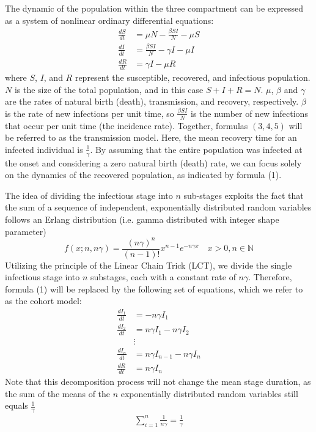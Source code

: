 \documentclass[12pt]{article}
\begin{document}
The dynamic of the population within the three compartment can be expressed as a system of nonlinear ordinary differential equations:
\begin{align}
    \frac{dS}{dt} &= \mu N - \frac{\beta SI}{N} - \mu S \\
    \frac{dI}{dt} &= \frac{\beta SI}{N} - \gamma I - \mu I \\
    \frac{dR}{dt} &= \gamma I - \mu R
\end{align}
where $S$, $I$, and $R$ represent the susceptible, recovered, and infectious population. $N$ is the size of the total population, and in this case $S + I + R = N$. $\mu$, $\beta$ and $\gamma$ are the rates of natural birth (death), transmission, and recovery, respectively. $\beta$ is the rate of new infections per unit time, so $\frac{\beta SI}{N}$ is the number of new infections that occur per unit time (the incidence rate). Together, formulas $(3,4,5)$ will be referred to as the transmission model. Here, the mean recovery time for an infected individual is $\frac{1}{\gamma}$. By assuming that the entire population was infected at the onset and considering a zero natural birth (death) rate, we can focus solely on the dynamics of the recovered population, as indicated by formula (1). 

The idea of dividing the infectious stage into $n$ sub-stages exploits the fact that the sum of a sequence of independent, exponentially distributed random variables follows an Erlang distribution (i.e. gamma distributed with integer shape parameter) \cite{therrien2018probability}
\begin{equation}
    f(x; n,n\gamma) = \frac{(n\gamma)^n}{(n-1)!} x^{n-1} e^{-n\gamma x} \quad x>0, n \in \mathbb{N}
\end{equation}
Utilizing the principle of the Linear Chain Trick (LCT), we divide the single infectious stage into $n$ substages, each with a constant rate of $n\gamma$. Therefore, formula (1) will be replaced by the following set of equations, which we refer to as the cohort model:
\begin{align}
    \frac{dI_1}{dt} &= - n \gamma I_1 \\
    \frac{dI_2}{dt} &= n\gamma I_1 - n \gamma I_2 \\
    &\vdots \\
    \frac{dI_n}{dt} &= n\gamma I_{n-1} - n \gamma I_n \\
    \frac{dR}{dt} &= n \gamma I_n
\end{align}
Note that this decomposition process will not change the mean stage duration, as the sum of the means of the $n$ exponentially distributed random variables still equals $\frac{1}{\gamma}$
\begin{align*}
    \sum_{i=1}^{n} \frac{1}{n\gamma} = \frac{1}{\gamma}
\end{align*}
\end{document}
